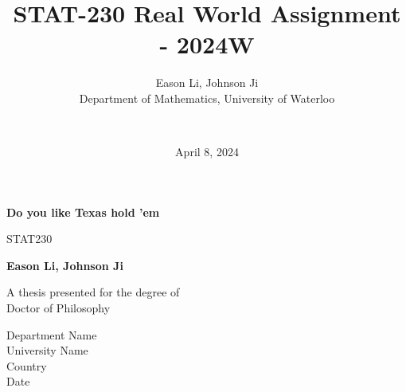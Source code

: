 \documentclass{article}
\title{STAT-230 Real World Assignment - 2024W}
\author{
    Eason Li, Johnson Ji \\
    Department of Mathematics, University of Waterloo \and \\
}
\date{April 8, 2024} %
\begin{document}
\begin{titlepage}
    \begin{center}
        \vspace*{1cm}
            
        \Huge
        \textbf{Do you like Texas hold 'em}
            
        \vspace{0.5cm}
        \LARGE
        STAT230 
            
        \vspace{1.5cm}
            
        \textbf{Eason Li, Johnson Ji}
            
        \vfill
            
        A thesis presented for the degree of\\
        Doctor of Philosophy
            
        \vspace{0.8cm}
            
        \Large
        Department Name\\
        University Name\\
        Country\\
        Date
            
    \end{center}
\end{titlepage}
\end{document}
